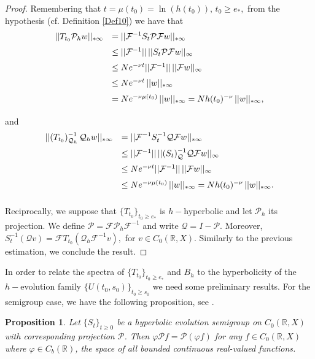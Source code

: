 \documentclass[10pt]{amsart}
\newtheorem{proposition}{Proposition}
\numberwithin{equation}{section}
\begin{document}
\begin{proof}
\medskip 
\noindent Remembering that $t = \mu(t_0) = \ln(h(t_0)), \, t_0 \ge e_*, $ from the hypothesis (cf. Definition \ref{Def10}) we have that 
$$
\begin{array}{rl}
\medskip
||T_{t_0}\mathcal{P}_h w||_{*\infty} &  \displaystyle = ||\mathcal{F}^{-1} S_t \mathcal{P} \mathcal{F} w||_{*\infty} \\
\medskip
& \le ||\mathcal{F}^{-1}|| \, || S_t \mathcal{P} \mathcal{F} w||_\infty \\
\medskip
& \le N e^{-\nu t}||\mathcal{F}^{-1}|| \,  ||\mathcal{F} w||_\infty \\
\medskip
& \le N e^{-\nu t} \,  ||w||_{*\infty} \\
\medskip 
& =  N e^{-\nu \mu(t_0)} \,  ||w||_{*\infty}  = N h(t_0)^{-\nu} \,  ||w||_{*\infty},
\end{array}$$
and 
$$
\begin{array}{rl}
\medskip
||(T_{t_0})^{-1}_{\mathcal{Q}_h} \, \mathcal{Q}_h w||_{*\infty} &  \displaystyle = ||\mathcal{F}^{-1} S_t^{-1} \mathcal{Q} \mathcal{F}w||_{*\infty} \\
\medskip
& \le ||\mathcal{F}^{-1}|| \, || (S_t)_{\mathcal{Q}}^{-1} \mathcal{Q} \mathcal{F}w||_\infty \\
\medskip
& \le N e^{-\nu t}||\mathcal{F}^{-1}|| \,  ||\mathcal{F}w||_\infty \\
\medskip 
& \le  N e^{-\nu \mu(t_0)} \,  ||w||_{*\infty}  = N h(t_0)^{-\nu} \,  ||w||_{*\infty}.
\end{array}$$

\medskip 
Reciprocally, we suppose that $\{T_{t_0}\}_{t_0 \ge e_*}$ is $h-$hyperbolic and let $\mathcal{P}_h$ its projection. We define $\mathcal{P} = \mathcal{F}  \mathcal{P}_h \mathcal{F}^{-1}$ and write  
$\mathcal{Q} = I - \mathcal{P}.$ Moreover, $S_t^{-1}(\mathcal{Q}v ) = \mathcal{F} T_{t_0} (\mathcal{Q}_h \mathcal{F}^{-1}v),$ for $v \in C_0(\mathbb{R},X).$ 
Similarly to the previous estimation, we conclude the result.

\end{proof}

In order to relate the spectra of $\{T_{t_0}\}_{t_0 \ge e_*}$ and $B_h$ to the hyperbolicity of the $h-$evolution family $\{U(t_0,s_0)\}_{t_0\ge s_0}$ we need some preliminary results. 
For the semigroup case, we have the following proposition, see \cite[Lemma 9.16]{EN}.

\begin{proposition}
 Let $\{S_t\}_{t\ge 0}$ be a hyperbolic evolution semigroup on $C_0(\mathbb{R},X)$ with corresponding projection  $\mathcal{P}$. Then $\varphi \mathcal{P} f = \mathcal{P}(\varphi f)$ for any $f \in C_0(\mathbb{R},X)$ where  $\varphi \in C_b(\mathbb{R})$, the space of all bounded continuous real-valued functions.
 \end{proposition}
\end{document}
